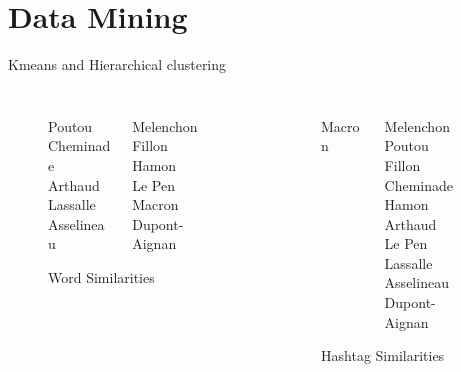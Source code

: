 \documentclass{beamer}
\begin{document}
\section{Data Mining}
\begin{frame}{Kmeans and Hierarchical clustering}
\begin{columns}
\begin{column}{.4\textwidth}
\center 
\begin{figure}
\begin{columns}
\begin{column}{.5\textwidth}
\center
Poutou\\
Cheminade\\
Arthaud\\
Lassalle\\
Asselineau\\
\end{column}


\begin{column}{.5\textwidth}
\center 
Melenchon\\
Fillon\\
Hamon\\
Le Pen\\
Macron\\
Dupont-Aignan
\end{column}
\end{columns}
\caption{Word Similarities}
\end{figure}
\end{column}


\vline

\begin{column}{.5\textwidth}
\center
\begin{figure}
\begin{columns}
\begin{column}{.5\textwidth}
\center
Macron
\end{column}

\begin{column}{.5\textwidth}
\center
Melenchon\\
Poutou\\
Fillon\\
Cheminade\\
Hamon\\
Arthaud\\
Le Pen\\
Lassalle\\
Asselineau\\
Dupont-Aignan
\end{column}
\end{columns}
\caption{Hashtag Similarities}
\end{figure}
\end{column}
\end{columns}


\end{frame}
\end{document}
